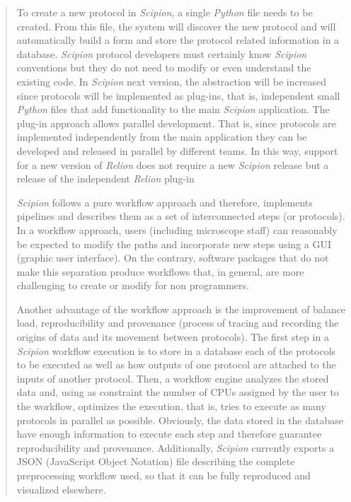 \documentclass[a4paper,12pt]{article}
\def\scipion{\textit{Scipion}\xspace}
\def\python{\textit{Python}\xspace}
\begin{document}
\begin{reviewer}
\begin{quote}
To create a new protocol in \scipion, a single \python file needs to be created. From this file, the system will discover the new protocol and will automatically build
a form and store the protocol related information in a database.
\scipion protocol developers must certainly know \scipion conventions
but they do not need to modify or even understand the existing code.
In  \scipion next version, the abstraction will be increased
since protocols will be implemented as plug-ins,
that is, independent small \python files  that add functionality to the main
\scipion application. The plug-in approach allows parallel development. That is,  
since protocols are implemented independently from the main application
they can be developed and released in parallel by different teams. In this way, support for a new version of \textit{Relion} does not require a new \scipion release but
a release of the independent \textit{Relion} plug-in

\scipion follows a pure workflow approach and therefore, implements pipelines and describes them as a set of interconnected steps (or protocols). In a workflow approach, users (including microscope staff) can reasonably be expected to modify the paths and incorporate new steps using a GUI (graphic user interface). On the contrary, software packages that do not make this separation produce workflows that, in general, are more challenging to create or modify for non programmers. 

Another advantage of the workflow approach 
is the improvement of balance load, reproducibility and  provenance (process of tracing and recording the origins of data and its movement between protocols). The first step in a \scipion workflow execution
is to store in a database each of the protocols to be executed as well as how 
outputs of one protocol are attached to the inputs of another protocol. Then, a workflow engine analyzes the stored data and, using as constraint the number of CPUs assigned by the user to the workflow, optimizes the execution, that is, tries to execute as many protocols in parallel as possible. Obviously, the data stored in the database  have enough information to execute each step and therefore guarantee reproducibility and provenance. Additionally, \scipion currently exports a JSON (JavaScript Object Notation) file describing the complete preprocessing workflow used, so that it can be fully reproduced and visualized elsewhere.

\end{quote}



\end{reviewer}
\end{document}
